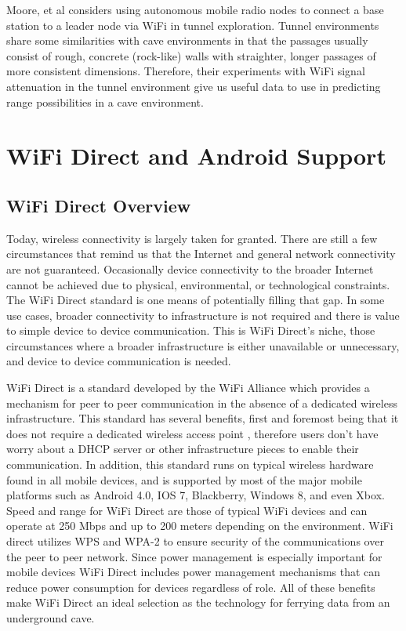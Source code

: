 \documentclass[10pt,twocolumn]{article}
\begin{document}
Moore, et al \cite{moore2012} considers using autonomous mobile radio nodes to connect a base station to a leader node via WiFi in tunnel exploration. 
Tunnel environments share some similarities with cave environments in that the passages usually consist of rough, concrete (rock-like) walls with straighter, longer passages of more consistent dimensions. 
Therefore, their experiments with WiFi signal attenuation in the tunnel environment give us useful data to use in predicting range possibilities in a cave environment.

\section{WiFi Direct and Android Support}

\subsection{WiFi Direct Overview}
\label{sec:WiFiD Overview}
Today, wireless connectivity is largely taken for granted. 
There are still a few circumstances that remind us that the Internet and general network connectivity are not guaranteed. 
Occasionally device connectivity to the broader Internet cannot be achieved due to physical, environmental, or technological constraints.
The WiFi Direct standard is one means of potentially filling that gap. 
In some use cases, broader connectivity to infrastructure is not required and there is value to simple device to device communication. 
This is WiFi Direct's niche, those circumstances where a broader infrastructure is either unavailable or unnecessary, and device to device communication is needed.

WiFi Direct is a standard developed by the WiFi Alliance which provides a mechanism for peer to peer communication in the absence of a dedicated wireless infrastructure. 
This standard has several benefits, first and foremost being that it does not require a dedicated wireless access point \cite{whywifid}, therefore users don't have worry about a DHCP server or other infrastructure pieces to enable their communication. 
In addition, this standard runs on typical wireless hardware found in all mobile devices, and is supported by most of the major mobile platforms such as Android 4.0, IOS 7, Blackberry, Windows 8, and even Xbox. 
Speed and range for WiFi Direct are those of typical WiFi devices and can operate at 250 Mbps and up to 200 meters depending on the environment. 
WiFi direct utilizes WPS and WPA-2 to ensure security of the communications over the peer to peer network. 
Since power management is especially important for mobile devices WiFi Direct includes power management mechanisms that can reduce power consumption for devices regardless of role.
All of these benefits make WiFi Direct an ideal selection as the technology for ferrying data from an underground cave.
\end{document}

